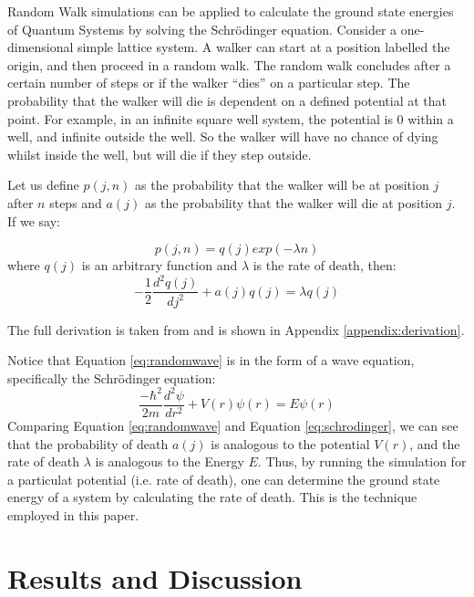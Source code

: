 \documentclass[journal]{IEEEtran}
\begin{document}
Random Walk simulations can be applied to calculate the ground state energies of
Quantum Systems by solving the Schr\"{o}dinger equation. Consider a
one-dimensional simple lattice system. A walker can start at a position labelled
the origin, and then proceed in a random walk. The random walk concludes after a
certain number of steps or if the walker ``dies'' on a particular step. The
probability that the walker will die is dependent on a defined potential at that
point. For example, in an infinite square well system, the potential is 0 within
a well, and infinite outside the well. So the walker will have no chance of
dying whilst inside the well, but will die if they step outside.

Let us define $p(j,n)$ as the probability that the walker will be at position
$j$ after $n$ steps and $a(j)$ as the probability that the walker will die at
position $j$. If we say:

\begin{equation}
  p(j,n) = q(j) exp(-\lambda n)
  \nonumber
\end{equation}
where $q(j)$ is an arbitrary function and $\lambda$ is the rate of death, then:
\begin{equation}
  -\frac{1}{2} \frac{d^2q(j)}{dj^2} + a(j)q(j) = \lambda q(j)
  \label{eq:randomwave}
\end{equation}

The full derivation is taken from  and is shown in Appendix
\ref{appendix:derivation}.

Notice that Equation \ref{eq:randomwave} is in the form of a wave equation,
specifically the Schr\"{o}dinger equation:
\begin{equation}
  \label{eq:schrodinger}
  \frac{-\hbar^2}{2m}\frac{d^2 \psi}{dr^2} + V(r)\psi(r) = E\psi(r)
\end{equation}
Comparing Equation \ref{eq:randomwave} and Equation \ref{eq:schrodinger}, we can
see that the probability of death $a(j)$ is analogous to the potential $V(r)$,
and the rate of death $\lambda$ is analogous to the Energy $E$. Thus, by running
the simulation for a particulat potential (i.e. rate of death), one can
determine the ground state energy of a system by calculating the rate of
death. This is the technique employed in this paper.


\section{Results and Discussion}
\end{document}
